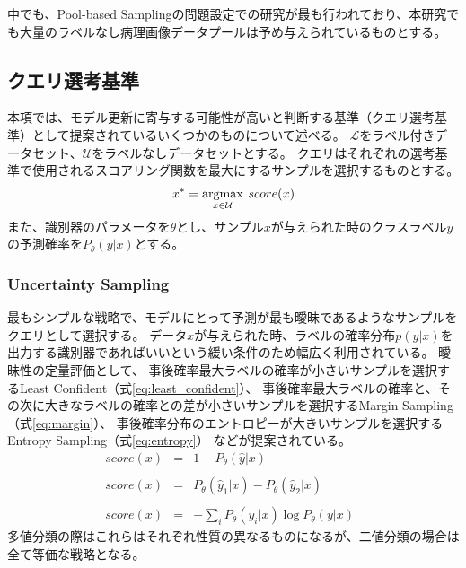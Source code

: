 中でも、Pool-based Samplingの問題設定での研究が最も行われており、本研究でも大量のラベルなし病理画像データプールは予め与えられているものとする。

\subsection{クエリ選考基準}
\label{query_strategy}
本項では、モデル更新に寄与する可能性が高いと判断する基準（クエリ選考基準）として提案されているいくつかのものについて述べる。
$\mathcal{L}$をラベル付きデータセット、$\mathcal{U}$をラベルなしデータセットとする。
クエリはそれぞれの選考基準で使用されるスコアリング関数を最大にするサンプルを選択するものとする。
\begin{eqnarray}
    x^{*} = \argmax_{x \in \mathcal{U}} \: score(x)
\end{eqnarray}
また、識別器のパラメータを$\theta$とし、サンプル$x$が与えられた時のクラスラベル$y$の予測確率を$P_{\theta}(y|x)$とする。

\subsubsection{Uncertainty Sampling \cite{lewis1994sequential}} 
最もシンプルな戦略で、モデルにとって予測が最も曖昧であるようなサンプルをクエリとして選択する。
データ$x$が与えられた時、ラベルの確率分布$p(y|x)$を出力する識別器であればいいという緩い条件のため幅広く利用されている。
曖昧性の定量評価として、
事後確率最大ラベルの確率が小さいサンプルを選択するLeast Confident（式\ref{eq:least_confident}）、
事後確率最大ラベルの確率と、その次に大きなラベルの確率との差が小さいサンプルを選択するMargin Sampling（式\ref{eq:margin}）、
事後確率分布のエントロピーが大きいサンプルを選択するEntropy Sampling（式\ref{eq:entropy}）
などが提案されている。
\begin{eqnarray}
    score(x) &=& 1 - P_{\theta}(\hat{y}|x)  \;\;  \label{eq:least_confident} \\ \nonumber \\ 
    score(x) &=& P_{\theta}(\hat{y}_1|x) - P_{\theta}(\hat{y}_2|x)  \;\;  \label{eq:margin}\\ \nonumber \\
    score(x) &=& - \sum_i {P_{\theta}(y_i|x)} \log P_{\theta}(y|x)  \;\;  \label{eq:entropy}
\end{eqnarray}
多値分類の際はこれらはそれぞれ性質の異なるものになるが、二値分類の場合は全て等価な戦略となる。

